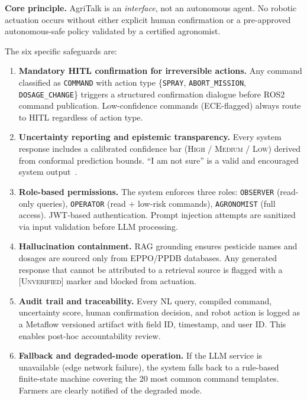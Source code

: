 \documentclass[11pt,a4paper]{article}
\begin{document}
\begin{mdframed}[backgroundcolor=red!5, linewidth=0.5pt]
\textbf{Core principle.} AgriTalk is an \emph{interface}, not an autonomous agent.
No robotic actuation occurs without either explicit human confirmation or a pre-approved
autonomous-safe policy validated by a certified agronomist.
\end{mdframed}

The six specific safeguards are:

\begin{enumerate}[leftmargin=1.2em,itemsep=3pt]
  \item \textbf{Mandatory HITL confirmation for irreversible actions.}
  Any command classified as \texttt{COMMAND} with action type \{\texttt{SPRAY}, \texttt{ABORT\_MISSION}, \texttt{DOSAGE\_CHANGE}\} triggers a structured confirmation dialogue before ROS2 command publication.
  Low-confidence commands (ECE-flagged) always route to HITL regardless of action type.

  \item \textbf{Uncertainty reporting and epistemic transparency.}
  Every system response includes a calibrated confidence bar (\textsc{High / Medium / Low})
  derived from conformal prediction bounds. ``I am not sure'' is a valid and encouraged
  system output~\cite{amershi_2019}.

  \item \textbf{Role-based permissions.}
  The system enforces three roles: \texttt{OBSERVER} (read-only queries), \texttt{OPERATOR}
  (read + low-risk commands), \texttt{AGRONOMIST} (full access). JWT-based authentication.
  Prompt injection attempts are sanitized via input validation before LLM processing.

  \item \textbf{Hallucination containment.}
  RAG grounding ensures pesticide names and dosages are sourced only from EPPO/PPDB
  databases. Any generated response that cannot be attributed to a retrieval source is
  flagged with a \textsc{[Unverified]} marker and blocked from actuation.

  \item \textbf{Audit trail and traceability.}
  Every NL query, compiled command, uncertainty score, human confirmation decision, and
  robot action is logged as a Metaflow versioned artifact with field ID, timestamp,
  and user ID. This enables post-hoc accountability review.

  \item \textbf{Fallback and degraded-mode operation.}
  If the LLM service is unavailable (edge network failure), the system falls back to
  a rule-based finite-state machine covering the 20 most common command templates.
  Farmers are clearly notified of the degraded mode.
\end{enumerate}
\end{document}
